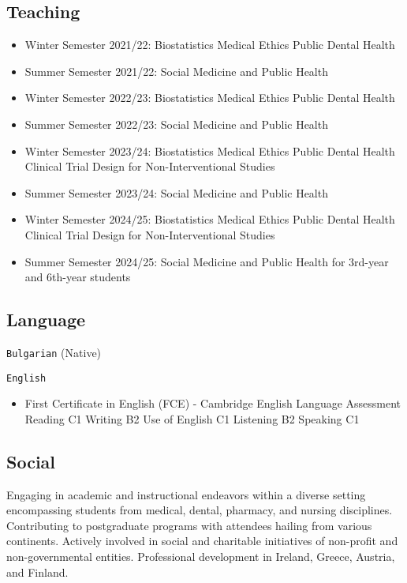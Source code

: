 \documentclass[
  12pt,
  letterpaper,
  DIV=11,
  numbers=noendperiod]{scrartcl}
\providecommand{\tightlist}{%
  \setlength{\itemsep}{0pt}\setlength{\parskip}{0pt}}\usepackage{longtable,booktabs,array}
\begin{document}
\subsection{Teaching}\label{teaching}

\begin{itemize}
\item
  Winter Semester 2021/22: Biostatistics \textbar{} Medical Ethics
  \textbar{} Public Dental Health
\item
  Summer Semester 2021/22: Social Medicine and Public Health
\item
  Winter Semester 2022/23: Biostatistics \textbar{} Medical Ethics
  \textbar{} Public Dental Health
\item
  Summer Semester 2022/23: Social Medicine and Public Health
\item
  Winter Semester 2023/24: Biostatistics \textbar{} Medical Ethics
  \textbar{} Public Dental Health \textbar{} Clinical Trial Design for
  Non-Interventional Studies
\item
  Summer Semester 2023/24: Social Medicine and Public Health
\item
  Winter Semester 2024/25: Biostatistics \textbar{} Medical Ethics
  \textbar{} Public Dental Health \textbar{} Clinical Trial Design for
  Non-Interventional Studies
\item
  Summer Semester 2024/25: Social Medicine and Public Health for
  3rd-year and 6th-year students
\end{itemize}

\subsection{Language}\label{language}

\texttt{Bulgarian} (Native)

\texttt{English}

\begin{itemize}
\tightlist
\item
  First Certificate in English (FCE) - Cambridge English Language
  Assessment \textbar{} Reading C1 \textbar{} Writing B2 \textbar{} Use
  of English C1 \textbar{} Listening B2 \textbar{} Speaking C1
\end{itemize}

\subsection{Social}\label{social}

Engaging in academic and instructional endeavors within a diverse
setting encompassing students from medical, dental, pharmacy, and
nursing disciplines. Contributing to postgraduate programs with
attendees hailing from various continents. Actively involved in social
and charitable initiatives of non-profit and non-governmental entities.
Professional development in Ireland, Greece, Austria, and Finland.
\end{document}
